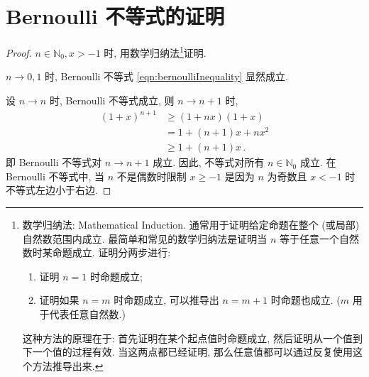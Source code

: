 \documentclass{book}
\newcommand{\N}{\mathbb{N}}
\numberwithin{equation}{section}
\numberwithin{figure}{section}
\theoremstyle{definition}
\begin{document}
\section{Bernoulli 不等式的证明}
\label{proof:bernoulliInequaliy}
\begin{proof}
  $n\in\N_0,x>-1$ 时, 用数学归纳法\footnote{数学归纳法: Mathematical Induction. 通常用于证明给定命题在整个 (或局部) 自然数范围内成立. 最简单和常见的数学归纳法是证明当 $n$ 等于任意一个自然数时某命题成立. 证明分两步进行:
    \begin{enumerate}
      \item 证明 $n=1$ 时命题成立;
      \item 证明如果 $n=m$ 时命题成立, 可以推导出 $n=m+1$ 时命题也成立. ($m$ 用于代表任意自然数.)
    \end{enumerate}
    这种方法的原理在于: 首先证明在某个起点值时命题成立, 然后证明从一个值到下一个值的过程有效. 当这两点都已经证明, 那么任意值都可以通过反复使用这个方法推导出来.}证明.

  $n\to0,1$ 时, Bernoulli 不等式 \cref{eqn:bernoulliInequality} 显然成立.

  设 $n\to n$ 时, Bernoulli 不等式成立, 则 $n\to n+1$ 时,
  \begin{align*}
    (1+x)^{n+1}&\geqslant (1+nx)(1+x)\\
    &=1+(n+1)x+nx^2\\
    &\geqslant 1+(n+1)x\,.
  \end{align*}
  即 Bernoulli 不等式对 $n\to n+1$ 成立.
  因此, 不等式对所有 $n\in\N_0$ 成立.
  在 Bernoulli 不等式中, 当 $n$ 不是偶数时限制 $x\geqslant -1$ 是因为 $n$ 为奇数且 $x<-1$ 时不等式左边小于右边.
\end{proof}
\end{document}
